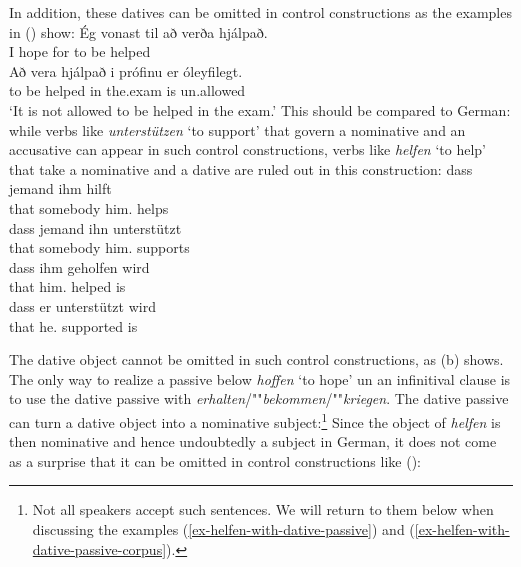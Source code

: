 In addition, these datives can be omitted in control constructions as the examples in () show:
\eal
\ex
\gll Ég vonast til að verða hjálpað.\\
     I  hope   for to be helped\\\icelandic
\ex
\gll Að vera hjálpað i prófinu er óleyfilegt.\\
     to be helped in the.exam is un.allowed\\
\glt `It is not allowed to be helped in the exam.'
\zl
This should be compared to German: while verbs like \emph{unterstützen} `to support' that govern a
nominative and an accusative can appear in such control constructions, verbs like \emph{helfen} `to
help' that take a nominative and a dative are ruled out in this construction:
\eal
\ex 
\gll dass jemand ihm hilft\\
     that somebody him.\DAT{} helps\\\german
\ex
\gll dass jemand ihn unterstützt\\
     that somebody him.\ACC{} supports\\
\ex
\gll  dass ihm geholfen wird\\
      that him.\DAT{} helped is\\
\ex
\gll  dass er unterstützt wird\\
      that he.\NOM{} supported is\\
\zl

\eal
{}
\zl
The dative object cannot be omitted in such control constructions, as (b) shows. The only way
to realize a passive below \emph{hoffen} `to hope' un an infinitival clause is to use the dative passive with
\emph{erhalten}/""\emph{bekommen}/""\emph{kriegen}. The dative passive can turn a dative object into a
nominative subject:\footnote{
  Not all speakers accept such sentences. We will return to them below when discussing the examples
  (\ref{ex-helfen-with-dative-passive}) and (\ref{ex-helfen-with-dative-passive-corpus}).
}
\z
Since the object of \emph{helfen} is then nominative and hence undoubtedly a subject in German, it
does not come as a surprise that it can be omitted in control constructions like ():
\z



